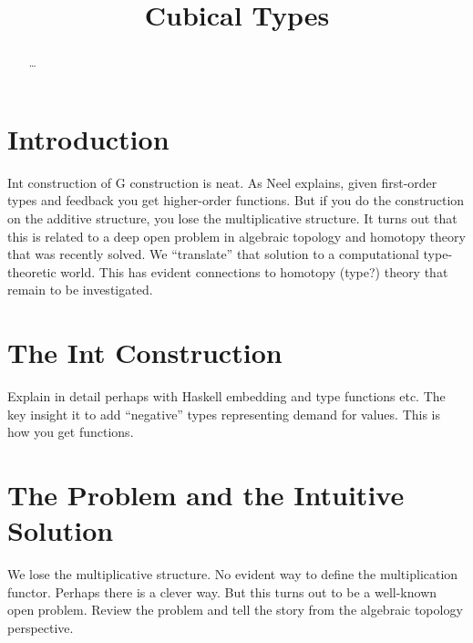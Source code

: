 \documentclass[authoryear,preprint]{sigplanconf}
\begin{document}
\lstset{breaklines=true, breakatwhitespace=true}
\lstset{numbers=none, numbersep=5pt, stepnumber=2, numberstyle=\scriptsize}
\lstset{rangeprefix=/*!\ , rangesuffix=\ !*\/, includerangemarker=false}

\title{Cubical Types}
\authorinfo{}{}{}
\maketitle

\begin{abstract}
\ldots
\end{abstract}

\section{Introduction}

Int construction of G construction is neat. As Neel explains, given
first-order types and feedback you get higher-order functions. But if you do
the construction on the additive structure, you lose the multiplicative
structure. It turns out that this is related to a deep open problem in
algebraic topology and homotopy theory that was recently solved. We
``translate'' that solution to a computational type-theoretic world. This has
evident connections to homotopy (type?) theory that remain to be
investigated.

\section{The Int Construction} 

Explain in detail perhaps with Haskell embedding and type functions etc. The
key insight it to add ``negative'' types representing demand for values. This
is how you get functions.

\section{The Problem and the Intuitive Solution}

We lose the multiplicative structure. No evident way to define the
multiplication functor. Perhaps there is a clever way. But this turns out to
be a well-known open problem. Review the problem and tell the story from the
algebraic topology perspective.
\end{document}
